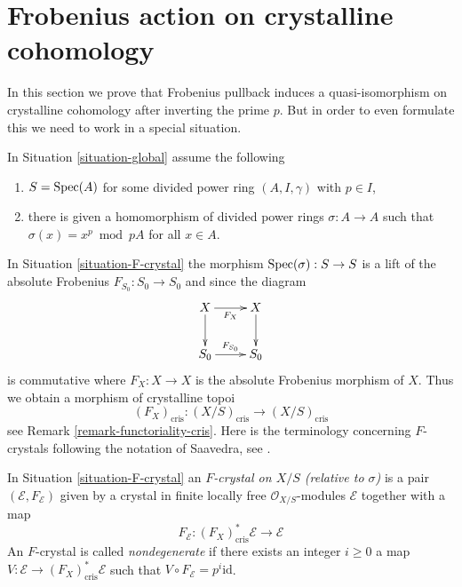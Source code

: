 \section{Frobenius action on crystalline cohomology}
\label{section-frobenius}

\noindent
In this section we prove that Frobenius pullback induces a quasi-isomorphism
on crystalline cohomology after inverting the prime $p$. But in order to
even formulate this we need to work in a special situation.

\begin{situation}
\label{situation-F-crystal}
In Situation \ref{situation-global} assume the following
\begin{enumerate}
\item $S = \mathop{\mathrm{Spec}}(A)$ for some divided power ring $(A, I, \gamma)$
with $p \in I$,
\item there is given a homomorphism of divided power rings $\sigma : A \to A$
such that $\sigma(x) = x^p \bmod pA$ for all $x \in A$.
\end{enumerate}
\end{situation}

\noindent
In Situation \ref{situation-F-crystal} the morphism
$\mathop{\mathrm{Spec}}(\sigma) : S \to S$ is a lift of the absolute Frobenius
$F_{S_0} : S_0 \to S_0$ and since the diagram
$$
\xymatrix{
X \ar[d] \ar[r]_{F_X} & X \ar[d] \\
S_0 \ar[r]^{F_{S_0}} & S_0
}
$$
is commutative where $F_X : X \to X$ is the absolute Frobenius morphism
of $X$. Thus we obtain a morphism of crystalline topoi
$$
(F_X)_{\text{cris}} :
(X/S)_{\text{cris}}
\longrightarrow
(X/S)_{\text{cris}}
$$
see Remark \ref{remark-functoriality-cris}. Here is the terminology concerning
$F$-crystals following the notation of Saavedra, see
\cite{Saavedra}.

\begin{definition}
\label{definition-F-crystal}
In Situation \ref{situation-F-crystal} an {\it $F$-crystal on $X/S$
(relative to $\sigma$)} is a pair $(\mathcal{E}, F_\mathcal{E})$
given by a crystal in finite locally free $\mathcal{O}_{X/S}$-modules
$\mathcal{E}$ together with a map
$$
F_\mathcal{E} : (F_X)_{\text{cris}}^*\mathcal{E} \longrightarrow \mathcal{E}
$$
An $F$-crystal is called {\it nondegenerate} if there exists an integer
$i \geq 0$ a map $V : \mathcal{E} \to (F_X)_{\text{cris}}^*\mathcal{E}$
such that $V \circ F_{\mathcal{E}} = p^i \text{id}$.
\end{definition}

